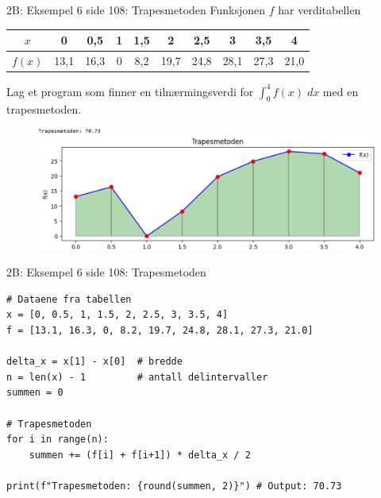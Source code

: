 \greenheader
\begin{frame}{2B: Eksempel 6 side 108: Trapesmetoden}
Funksjonen $f$ har verditabellen
\begin{table}[h]
\centering
\begin{tabular}{c|ccccccccc}
$x$ & 0 & 0,5 & 1 & 1,5 & 2 & 2,5 & 3 & 3,5 & 4 \\
\hline
$f(x)$ & 13,1 & 16,3 & 0 & 8,2 & 19,7 & 24,8 & 28,1 & 27,3 & 21,0 \\
\end{tabular}
\end{table}
Lag et program som finner en tilnærmingsverdi for $\int_0^4 f(x)\;dx$ med en trapesmetoden.
\begin{figure}
    \centering
    \includegraphics[width=0.8\linewidth]{R2-K2B-11.png}

\end{figure}
\end{frame}

\greenheader
\begin{frame}[fragile]{2B: Eksempel 6 side 108: Trapesmetoden}
\begin{verbatim}
# Dataene fra tabellen
x = [0, 0.5, 1, 1.5, 2, 2.5, 3, 3.5, 4]
f = [13.1, 16.3, 0, 8.2, 19.7, 24.8, 28.1, 27.3, 21.0]

delta_x = x[1] - x[0]  # bredde
n = len(x) - 1         # antall delintervaller
summen = 0

# Trapesmetoden
for i in range(n):
    summen += (f[i] + f[i+1]) * delta_x / 2

print(f"Trapesmetoden: {round(summen, 2)}") # Output: 70.73
\end{verbatim}
\end{frame}






















